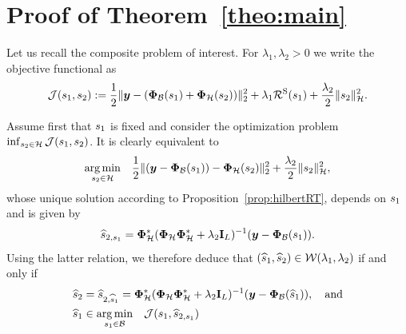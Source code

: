 
\clearpage
\appendix

\section{Proof of Theorem~\ref{theo:main}}
\label{app:prooftheo1}

    Let us recall the composite problem of interest. For $\lambda_1, \lambda_2 > 0$ we write the objective functional as
    \begin{equation*}
        \mathcal{J}(s_1, s_2) := \frac{1}{2} \| \bm{y} - (\bm{\Phi}_\mathcal{B} (s_1) + \bm{\Phi}_\mathcal{H} (s_2)) \|_2^2  + \lambda_{1} \mathcal{R}^\mathrm{S}(s_1) + \frac{\lambda_{2}}{2} \| s_2 \|_{\mathcal{H}}^2.
    \end{equation*}
    
    
    Assume first that $s_1$ is fixed and consider the optimization problem $\inf_{s_2 \in \mathcal{H}} \mathcal{J}(s_1, s_2)$. It is clearly equivalent to
    \begin{equation*}
        \underset{s_2 \in \mathcal{H}}{\arg\min}  \quad \frac{1}{2} \| (\bm{y} - \bm{\Phi}_\mathcal{B}(s_1)) - \bm{\Phi}_\mathcal{H}(s_2) \|_2^2 + \frac{\lambda_{2}}{2} \| s_2 \|_{\mathcal{H}}^2,
    \end{equation*}
    whose unique solution according to Proposition~\ref{prop:hilbertRT}, depends on $s_1$ and is given by
    \begin{equation}
        \label{eq:hatfwithfb}
        \widehat{s}_{2, s_1} =\bm{\Phi}_\mathcal{H}^* ( \bm{\Phi}_\mathcal{H} \bm{\Phi}_\mathcal{H}^* + \lambda_{2} \mathbf{I}_L)^{-1} ( \bm{y} - \bm{\Phi}_\mathcal{B}(s_1) ). 
    \end{equation}
    Using the latter relation, we therefore deduce that $(\widehat{s}_1,\widehat{s}_2) \in \mathcal{W} (\lambda_{1},\lambda_{2})$ if and only if  
    \begin{align}
        \widehat{s}_2 &= \widehat{s}_{2,\widehat{s}_1} = \bm{\Phi}_\mathcal{H}^* ( \bm{\Phi}_\mathcal{H} \bm{\Phi}_\mathcal{H}^* + \lambda_{2} \mathbf{I}_L)^{-1} ( \bm{y} - \bm{\Phi}_\mathcal{B}(\widehat{s}_1) ) , \quad \text{and} \label{eq:findmethishfh}\\
        \widehat{s}_1 &\in\underset{s_1 \in \mathcal{B}}{\arg\min}  \quad \mathcal{J}(s_1, \widehat{s}_{2, s_1}) \label{eq:newhproblem}
    \end{align}

